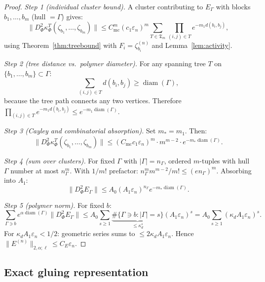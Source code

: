 \documentclass[12pt]{article}
\theoremstyle{plain}
\theoremstyle{definition}
\numberwithin{equation}{section}
\newcommand{\diam}{\operatorname{diam}}
\begin{document}
\begin{proof}
\emph{Step 1 (individual cluster bound).}  A cluster contributing to $E_\Gamma$ with blocks $b_1,\ldots,b_m$ (hull $=\Gamma$) gives:
\begin{equation}
\|D_\Phi^2\kappa_\Phi^T(\zeta_{b_1},\ldots,\zeta_{b_m})\|\leq C_{\mathrm{mc}}^m(c_1\varepsilon_n)^m\sum_{T\in\mathfrak{T}_m}\prod_{(i,j)\in T}e^{-m_1 d(b_i,b_j)},
\end{equation}
using Theorem~\ref{thm:treebound} with $F_i=\zeta_{b_i}^{(n)}$ and Lemma~\ref{lem:activity}.

\emph{Step 2 (tree distance vs.\ polymer diameter).}  For any spanning tree $T$ on $\{b_1,\ldots,b_m\}\subset\Gamma$:
\begin{equation}
\sum_{(i,j)\in T}d(b_i,b_j)\geq\diam(\Gamma),
\end{equation}
because the tree path connects any two vertices.  Therefore $\prod_{(i,j)\in T}e^{-m_1 d(b_i,b_j)}\leq e^{-m_1\diam(\Gamma)}$.

\emph{Step 3 (Cayley and combinatorial absorption).}  Set $m_*=m_1$.  Then:
\begin{equation}
\|D_\Phi^2\kappa_\Phi^T(\zeta_{b_1},\ldots,\zeta_{b_m})\|\leq(C_{\mathrm{mc}}c_1\varepsilon_n)^m\cdot m^{m-2}\cdot e^{-m_*\diam(\Gamma)}.
\end{equation}

\emph{Step 4 (sum over clusters).}  For fixed $\Gamma$ with $|\Gamma|=n_\Gamma$, ordered $m$-tuples with hull $\Gamma$ number at most $n_\Gamma^m$.  With $1/m!$ prefactor: $n_\Gamma^m m^{m-2}/m!\leq(en_\Gamma)^m$.  Absorbing into $A_1$:
\begin{equation}
\|D_\Phi^2 E_\Gamma\|\leq A_0(A_1\varepsilon_n)^{n_\Gamma}e^{-m_*\diam(\Gamma)}.
\end{equation}

\emph{Step 5 (polymer norm).}  For fixed $b$:
\begin{equation}
\sum_{\Gamma\ni b}e^{\alpha\diam(\Gamma)}\|D_\Phi^2 E_\Gamma\|\leq A_0\sum_{s\geq 1}\underbrace{\#\{\Gamma\ni b:|\Gamma|=s\}}_{\leq\kappa_d^s}(A_1\varepsilon_n)^s = A_0\sum_{s\geq 1}(\kappa_d A_1\varepsilon_n)^s.
\end{equation}
For $\kappa_d A_1\varepsilon_n<1/2$: geometric series sums to $\leq 2\kappa_d A_1\varepsilon_n$.  Hence $\|E^{(n)}\|_{2,\alpha;\ell}\leq C_E\varepsilon_n$.
\end{proof}

\subsection{Exact gluing representation}
\end{document}
